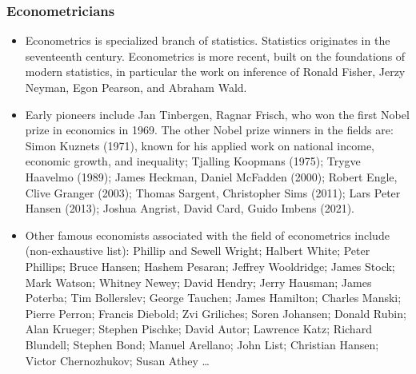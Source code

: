 \begin{frame}
\frametitle{Econometricians}
\begin{itemize}
\item Econometrics is specialized branch of statistics. Statistics originates in the seventeenth century. Econometrics is more recent, built on the foundations of modern statistics, in particular the work on inference of Ronald Fisher, Jerzy Neyman, Egon Pearson, and Abraham Wald.
\item Early pioneers include Jan Tinbergen, Ragnar Frisch, who won the first Nobel prize in economics in 1969. The other Nobel prize winners in the fields are: Simon Kuznets (1971), known for his applied work on national income, economic growth, and inequality; Tjalling Koopmans (1975); Trygve Haavelmo (1989); James Heckman, Daniel McFadden (2000); Robert Engle, Clive Granger (2003); Thomas Sargent, Christopher Sims (2011); Lars Peter Hansen (2013); Joshua Angrist, David Card, Guido Imbens (2021).
\item Other famous economists associated with the field of econometrics include (non-exhaustive list): Phillip and Sewell Wright; Halbert White; Peter Phillips; Bruce Hansen; Hashem Pesaran; Jeffrey Wooldridge; James Stock; Mark Watson; Whitney Newey; David Hendry; Jerry Hausman; James Poterba; Tim Bollerslev; George Tauchen; James Hamilton; Charles Manski; Pierre Perron; Francis Diebold; Zvi Griliches; Soren Johansen; Donald Rubin; Alan Krueger; Stephen Pischke; David Autor; Lawrence Katz; Richard Blundell; Stephen Bond; Manuel Arellano; John List; Christian Hansen; Victor Chernozhukov; Susan Athey \ldots\
\end{itemize}
\end{frame}


